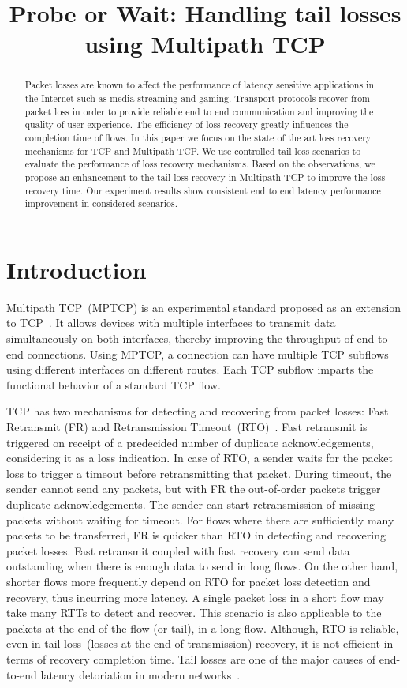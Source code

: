 \documentclass[10pt,conference,compsoc]{IEEEtran}
\title{Probe or Wait: Handling tail losses using Multipath TCP}
\author{\IEEEauthorblockN{Kiran~Yedugundla, Per~Hurtig, Anna~Brunstrom}
\IEEEauthorblockA{Dept. of Computer Science, Karlstad University, Karlstad, Sweden}}
\begin{document}
\maketitle

\begin{abstract}
Packet losses are known to affect the performance of latency sensitive applications in the Internet such as media streaming and gaming. Transport protocols recover from packet loss in order to provide reliable end to end communication and improving the quality of user experience. The efficiency of loss recovery greatly influences the completion time of flows. In this paper we focus on the state of the art loss recovery mechanisms for TCP and Multipath TCP. We use controlled tail loss scenarios to evaluate the performance of loss recovery mechanisms. Based on the observations, we propose an enhancement to the tail loss recovery in Multipath TCP to improve the loss recovery time. Our experiment results show consistent end to end latency performance improvement in considered scenarios. 
\end{abstract}

\section{Introduction}


Multipath TCP~(MPTCP) is an experimental standard proposed as an extension to TCP~\cite{rfc6824}. It allows devices with multiple interfaces to transmit data simultaneously on both interfaces, thereby improving the throughput of end-to-end connections. Using MPTCP, a connection can have multiple TCP subflows using different interfaces on different routes. Each TCP subflow imparts the functional behavior of a standard TCP flow. 

TCP has two mechanisms for detecting and recovering from packet losses: Fast Retransmit (FR) and Retransmission Timeout~(RTO)~\cite{Flach:2013}. Fast retransmit is triggered on receipt of a predecided number of duplicate acknowledgements, considering it as a loss indication. In case of RTO, a sender waits for the packet loss to trigger a timeout before retransmitting that packet. During timeout, the sender cannot send any packets, but with FR the out-of-order packets trigger duplicate acknowledgements. The sender can start retransmission of missing packets without waiting for timeout. For flows where there are sufficiently many packets to be transferred, FR is quicker than RTO in detecting and recovering packet losses. Fast retransmit coupled with fast recovery can send data outstanding when there is enough data to send in long flows. On the other hand, shorter flows more frequently depend on RTO for packet loss detection and recovery, thus incurring more latency. A single packet loss in a short flow may take many RTTs to detect and recover. This scenario is also applicable to the packets at the end of the flow (or tail), in a long flow. Although, RTO is reliable, even in tail loss~(losses at the end of transmission) recovery, it is not efficient in terms of recovery completion time. Tail losses are one of the major causes of end-to-end latency detoriation in modern networks~\cite{Flach:2013}. 
\end{document}
